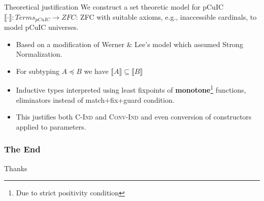 \documentclass[xcolor=dvipsnames]{beamer}
\begin{document}
\newcommand{\sem}[1]{\llbracket #1 \rrbracket}

\begin{frame}[t]{Theoretical justification}
We construct a set theoretic model for pCuIC
  $\sem{\cdot}: \mathit{Terms}_\mathit{pCuIC} \to ZFC$: ZFC with
  suitable axioms, e.g., inaccessible cardinals, to model pCuIC
  universes.

  \begin{itemize}
  \item Based on a modification of Werner \& Lee's model which
    assumed Strong Normalization.
  \item For subtyping $A \preceq B$ we have $\sem{A} \subseteq \sem{B}$
  \item Inductive types interpreted using least fixpoints of
    \textbf{monotone}\footnote{Due to strict positivity condition}
    functions, eliminators instead of match+fix+guard condition.
  \item This justifies both \textsc{C-Ind} and \textsc{Conv-Ind} and
    even conversion of constructors applied to parameters.
  \end{itemize}
\end{frame}

\begin{frame}
  \frametitle{The End}
\centering
\Huge Thanks
\end{frame}
\end{document}
